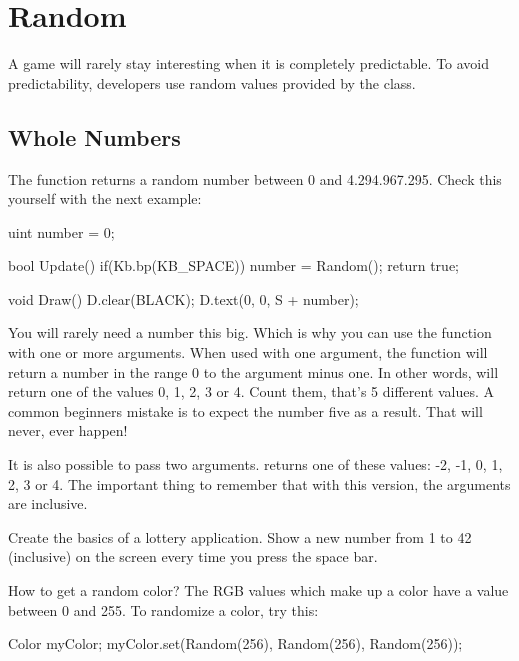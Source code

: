 \chapter{Random}
A game will rarely stay interesting when it is completely predictable. To avoid predictability, developers use random values provided by the  class.

\section{Whole Numbers}
The function  returns a random number between 0 and 4.294.967.295. Check this yourself with the next example:

\begin{code}
uint number = 0;

bool Update() {
  if(Kb.bp(KB_SPACE)) number = Random();
	return true;
}

void Draw() {
	D.clear(BLACK);
	D.text(0, 0, S + number);
}
\end{code}

You will rarely need a number this big. Which is why you can use the  function with one or more arguments. When used with one argument, the function will return a number in the range 0 to the argument minus one. In other words,   will return one of the values 0, 1, 2, 3 or 4. Count them, that's 5 different values. A common beginners mistake is to expect the number five as a result. That will never, ever happen!

It is also possible to pass two arguments.  returns one of these values: -2, -1, 0, 1, 2, 3 or 4. The important thing to remember that with this version, the arguments are inclusive.

\begin{exercise}
Create the basics of a lottery application. Show a new number from 1 to 42 (inclusive) on the screen every time you press the space bar. 
\end{exercise}

\begin{note}
How to get a random color? The RGB values which make up a color have a value between 0 and 255. To randomize a color, try this:

\begin{code}
Color myColor;
myColor.set(Random(256), Random(256), Random(256));
\end{code}
\end{note}

